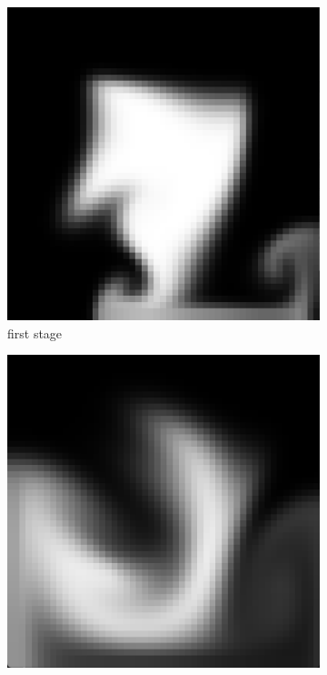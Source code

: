 \begin{figure}[h]
\begin{subfigure}[b]{0.2\textwidth}
        \includegraphics[width=\textwidth]{figures/grid50_1.png}
        \caption{first stage}
    \end{subfigure}
    \hspace{1em}
    \begin{subfigure}[b]{0.2\textwidth}
        \includegraphics[width=\textwidth]{figures/grid50_2.png}

\end{subfigure}
\end{figure}

